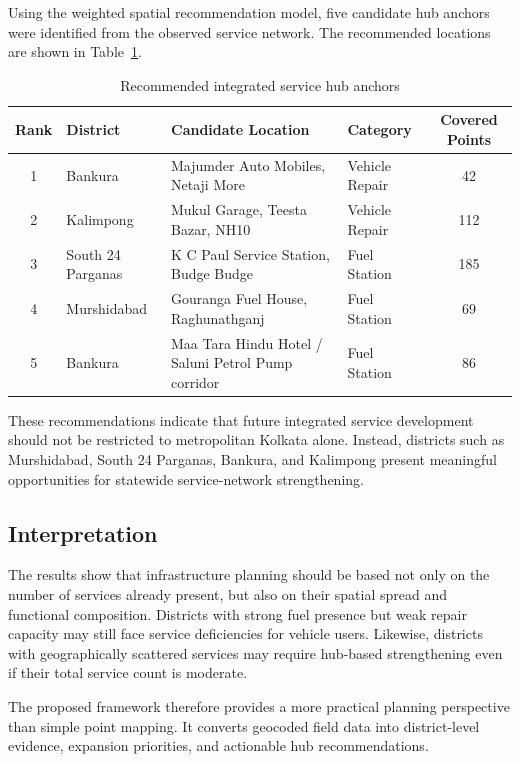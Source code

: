 Using the weighted spatial recommendation model, five candidate hub anchors were identified from the observed service network. The recommended locations are shown in Table~\ref{tab:recommended_hubs}.

\begin{table}[h!]
\centering
\caption{Recommended integrated service hub anchors}
\label{tab:recommended_hubs}
\begin{tabular}{|c|l|p{5.7cm}|l|c|}
\hline
\textbf{Rank} & \textbf{District} & \textbf{Candidate Location} & \textbf{Category} & \textbf{Covered Points} \\
\hline
1 & Bankura & Majumder Auto Mobiles, Netaji More & Vehicle Repair & 42 \\
2 & Kalimpong & Mukul Garage, Teesta Bazar, NH10 & Vehicle Repair & 112 \\
3 & South 24 Parganas & K C Paul Service Station, Budge Budge & Fuel Station & 185 \\
4 & Murshidabad & Gouranga Fuel House, Raghunathganj & Fuel Station & 69 \\
5 & Bankura & Maa Tara Hindu Hotel / Saluni Petrol Pump corridor & Fuel Station & 86 \\
\hline
\end{tabular}
\end{table}

These recommendations indicate that future integrated service development should not be restricted to metropolitan Kolkata alone. Instead, districts such as Murshidabad, South 24 Parganas, Bankura, and Kalimpong present meaningful opportunities for statewide service-network strengthening.

\subsection{Interpretation}

The results show that infrastructure planning should be based not only on the number of services already present, but also on their spatial spread and functional composition. Districts with strong fuel presence but weak repair capacity may still face service deficiencies for vehicle users. Likewise, districts with geographically scattered services may require hub-based strengthening even if their total service count is moderate.

The proposed framework therefore provides a more practical planning perspective than simple point mapping. It converts geocoded field data into district-level evidence, expansion priorities, and actionable hub recommendations.

